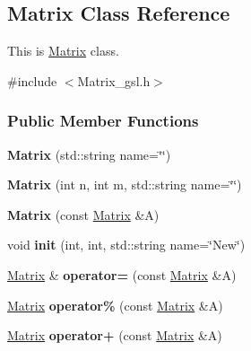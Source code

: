 \hypertarget{classMatrix}{}\subsection{Matrix Class Reference}
\label{classMatrix}


This is \hyperlink{classMatrix}{Matrix} class.  




{\ttfamily \#include $<$Matrix\+\_\+gsl.\+h$>$}

\subsubsection*{Public Member Functions}
\begin{DoxyCompactItemize}
\item 
\mbox{\label{classMatrix_a0531fe699e5bf4b90efa4b830d27e597}} 
{\bfseries Matrix} (std\+::string name=\char`\"{}\char`\"{})
\item 
\mbox{\label{classMatrix_a2523c9502e899b65732a624c9eda6c13}} 
{\bfseries Matrix} (int n, int m, std\+::string name=\char`\"{}\char`\"{})
\item 
\mbox{\label{classMatrix_aaceda49b8ba637f622d4ec3b427ff045}} 
{\bfseries Matrix} (const \hyperlink{classMatrix}{Matrix} \&A)
\item 
\mbox{\label{classMatrix_ae4726533935968ad55e45f7c39c79d19}} 
void {\bfseries init} (int, int, std\+::string name=\char`\"{}New\char`\"{})
\item 
\mbox{\label{classMatrix_a985b8ff0bd1f3bbd19cfa5fe9b9b9f31}} 
\hyperlink{classMatrix}{Matrix} \& {\bfseries operator=} (const \hyperlink{classMatrix}{Matrix} \&A)
\item 
\mbox{\label{classMatrix_ad154bc94a144a368cbcb7bd40e51feaa}} 
\hyperlink{classMatrix}{Matrix} {\bfseries operator\%} (const \hyperlink{classMatrix}{Matrix} \&A)
\item 
\mbox{\label{classMatrix_a60a307403e3482007487dfd60c8461b8}} 
\hyperlink{classMatrix}{Matrix} {\bfseries operator+} (const \hyperlink{classMatrix}{Matrix} \&A)
\item 
\mbox{\label{classMatrix_a528d48ea764ca99d8e0d4df6e86804dd}} 

\end{DoxyCompactItemize}
